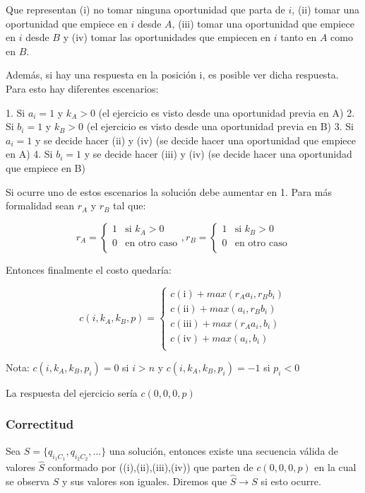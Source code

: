 \documentclass{article}
\begin{document}
Que representan (i) no tomar ninguna oportunidad que parta de $i$, (ii) tomar una oportunidad que empiece en $i$ desde $A$, (iii) tomar una oportunidad que empiece en $i$ desde $B$ y (iv) tomar las oportunidades que empiecen en $i$ tanto en $A$ como en $B$.

Además, si hay una respuesta en la posición i, es posible ver dicha respuesta. Para esto hay diferentes escenarios:

1. Si $a_i=1$ y $k_A>0$ (el ejercicio es visto desde una oportunidad previa en A)
2. Si $b_i=1$ y $k_B>0$ (el ejercicio es visto desde una oportunidad previa en B)
3. Si $a_i=1$ y se decide hacer (ii) y (iv) (se decide hacer una oportunidad que empiece en A)
4. Si $b_i=1$ y se decide hacer (iii) y (iv) (se decide hacer una oportunidad que empiece en B)

Si ocurre uno de estos escenarios la solución debe aumentar en 1. Para más formalidad sean $r_A$ y $r_B$ tal que:

$$
r_A =
\begin{cases}
1 & \text{si } k_A>0\\
0 & \text{en otro caso}\\
\end{cases}
,
r_B =
\begin{cases}
1 & \text{si } k_B>0\\
0 & \text{en otro caso}\\
\end{cases}
$$

Entonces finalmente el costo quedaría:

$$
c(i,k_A,k_B,p) =
\begin{cases}
c(\text{i})+max(r_Aa_i,r_Bb_i)\\
c(\text{ii})+max(a_i,r_Bb_i)\\
c(\text{iii})+max(r_Aa_i,b_i)\\
c(\text{iv})+max(a_i,b_i)\\
\end{cases}
$$

Nota: $c(i,k_A,k_B,p_i)=0$ si $i>n$ y $c(i,k_A,k_B,p_i)=-1$ si  $p_i<0$

La respuesta del ejercicio sería $c(0,0,0,p)$

\subsubsection{Correctitud}

Sea $S=\{q_{i_1C_1},q_{i_2C_2},\dots\}$ una solución, entonces existe una secuencia válida de valores $\widehat{S}$ conformado por ((i),(ii),(iii),(iv)) que parten de $c(0,0,0,p)$ en la cual se observa $S$ y sus valores son iguales. Diremos que $\widehat{S} \rightarrow S$ si esto ocurre.
\end{document}
